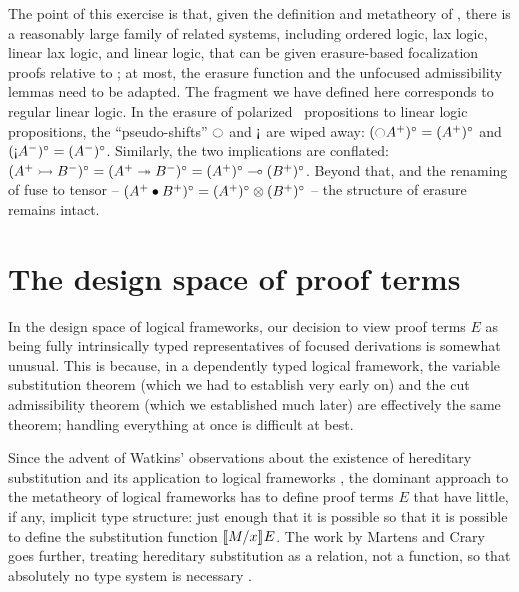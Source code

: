 The point of this exercise is that, given the definition and
metatheory of \ollll, there is a reasonably large family of related
systems, including ordered logic, lax logic, linear lax logic, and
linear logic, that can be given erasure-based focalization proofs
relative to \ollll; at most, the erasure function and the unfocused
admissibility lemmas need to be adapted. The fragment we have defined
here corresponds to regular linear logic. In the erasure of polarized
\ollll~propositions to linear logic propositions, the
``pseudo-shifts'' ${\ocircle}$ and ${\gnab}$ are wiped away:
$({\ocircle}A^+)^\circ = (A^+)^\circ$ and $({\gnab}A^-)^\circ =
(A^-)^\circ$.  Similarly, the two implications are conflated: $(A^+
\rightarrowtail B^-)^\circ = (A^+ \twoheadrightarrow B^-)^\circ = (A^+)^\circ \multimap
(B^+)^\circ$. Beyond that, and the renaming of fuse to tensor -- $(A^+
\mathbin{\bullet} B^+)^\circ = (A^+)^\circ \otimes (B^+)^\circ$ -- the structure
of erasure remains intact.

\section{The design space of proof terms}

In the design space of logical frameworks, our decision to view
proof terms $E$ as being fully intrinsically typed representatives
of focused derivations is somewhat unusual. This is because, in 
a dependently typed logical framework, the variable substitution
theorem (which we had to establish very early on) and the cut 
admissibility theorem (which we established much later) are effectively
the same theorem; handling everything at once is difficult at best.

Since the advent of Watkins' observations about the existence of
hereditary substitution and its application to logical frameworks
\cite{watkins02concurrent}, the dominant approach to the metatheory of
logical frameworks has to define proof terms $E$ that have little, if
any, implicit type structure: just enough that it is possible so that
it is possible to define the substitution function
$\llbracket {M}/{x} \rrbracket^{} {E}$. The work by Martens and Crary goes further,
treating hereditary substitution as a relation, not a function, so
that absolutely no type system is necessary
\cite{martens11mechanizing}. 

